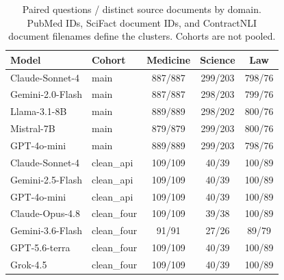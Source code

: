 \begin{table}[t]
\caption{Paired questions / distinct source documents by domain. PubMed IDs, SciFact document IDs, and ContractNLI document filenames define the clusters. Cohorts are not pooled.}
\label{tab:document_counts}
\centering\small
\setlength{\tabcolsep}{3.5pt}
\begin{tabular}{llccc}
\toprule
Model & Cohort & Medicine & Science & Law \\
\midrule
Claude-Sonnet-4 & main & 887/887 & 299/203 & 798/76 \\
Gemini-2.0-Flash & main & 887/887 & 298/203 & 799/76 \\
Llama-3.1-8B & main & 889/889 & 298/202 & 800/76 \\
Mistral-7B & main & 879/879 & 299/203 & 800/76 \\
GPT-4o-mini & main & 889/889 & 299/203 & 798/76 \\
Claude-Sonnet-4 & clean\_api & 109/109 & 40/39 & 100/89 \\
Gemini-2.5-Flash & clean\_api & 109/109 & 40/39 & 100/89 \\
GPT-4o-mini & clean\_api & 109/109 & 40/39 & 100/89 \\
Claude-Opus-4.8 & clean\_four & 109/109 & 39/38 & 100/89 \\
Gemini-3.6-Flash & clean\_four & 91/91 & 27/26 & 89/79 \\
GPT-5.6-terra & clean\_four & 109/109 & 40/39 & 100/89 \\
Grok-4.5 & clean\_four & 109/109 & 40/39 & 100/89 \\
\bottomrule
\end{tabular}
\end{table}
